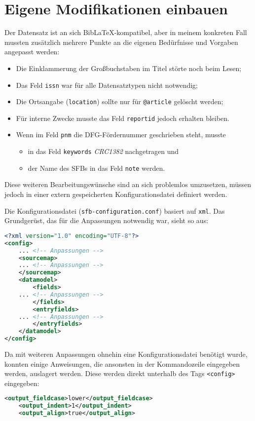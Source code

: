 \documentclass[ngerman]{dtk}
\begin{document}
\section{Eigene Modifikationen einbauen}
Der Datensatz ist an sich BibLaTeX-kompatibel, aber in meinem konkreten Fall 
mussten zusätzlich mehrere Punkte 
an die eigenen Bedürfnisse und Vorgaben angepasst werden:
\begin{itemize}
\item Die Einklammerung der Großbuchstaben im Titel störte noch beim Lesen;
\item Das Feld \texttt{issn} war für alle Datensatztypen nicht notwendig;
\item Die Ortsangabe (\texttt{location}) sollte nur für \texttt{@article} gelöscht werden;
\item Für interne Zwecke musste das Feld \texttt{reportid} jedoch erhalten bleiben.
\item Wenn im Feld \texttt{pnm} die DFG-Fördernummer geschrieben steht, musste
\begin{itemize}
\item in das Feld \texttt{keywords} \emph{CRC1382} nachgetragen und
\item der Name des SFBs in das Feld \texttt{note} werden.
\end{itemize}
\end{itemize}
Diese weiteren Bearbeitungswünsche sind an sich problemlos umzusetzen,
müssen jedoch in einer extern gespeicherten Konfigurationsdatei definiert werden.


Die Konfigurationsdatei (\texttt{sfb-configuration.conf}) basiert auf \texttt{xml}. Das Grundgerüst, das für die Anpassungen notwendig war, sieht so aus:
\begin{lstlisting}[style=number,language=xml]
<?xml version="1.0" encoding="UTF-8"?>
<config>
    ... <!-- Anpassungen -->
    <sourcemap>
    ... <!-- Anpassungen -->
    </sourcemap>
    <datamodel>
        <fields>
    ... <!-- Anpassungen -->
        </fields>
        <entryfields>
    ... <!-- Anpassungen -->
        </entryfields>
    </datamodel>
</config>
\end{lstlisting}
Da mit weiteren Anpassungen ohnehin eine Konfigurationsdatei benötigt wurde,
konnten einige Anweisungen, die ansonsten in der Kommandozeile eingegeben werden, auslagert werden.
Diese werden direkt unterhalb des Tags \texttt{<config>} eingegeben:
\begin{lstlisting}[style=nonumber,language=xml]
    <output_fieldcase>lower</output_fieldcase>
    <output_indent>1</output_indent>
    <output_align>true</output_align>
\end{lstlisting}
\end{document}
